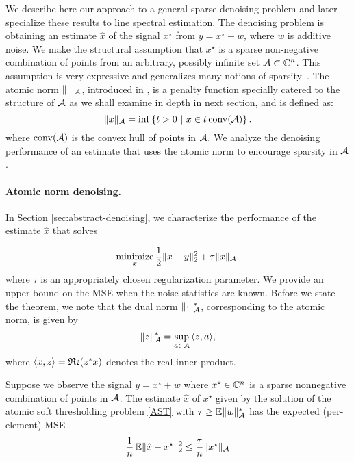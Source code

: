 We describe here our approach to a general sparse denoising problem and later
specialize these results to line spectral estimation. The denoising problem is
obtaining an estimate $\hat{x}$ of the signal $x^\star$ from $y = x^\star + w$,
where $w$ is additive noise. We make the structural assumption that $x^\star$ is
a sparse non-negative combination of points from an arbitrary, possibly infinite
set $\mathcal{A} \subset \mathbb{C}^n$. This assumption is very expressive and generalizes many
notions of sparsity~\cite{crpw}. The atomic norm $\lVert\cdot\rVert_{\mathcal{A}}$, introduced
in \cite{crpw}, is a penalty function specially catered to the structure of $\mathcal{A}$
as we shall examine in depth in next section, and is defined as:
\begin{equation*} \lVert x\rVert_{\mathcal{A}} = \inf\left\{t > 0 ~\middle|~ x \in t \operatorname{conv}(\mathcal{A})
\right\}. \end{equation*} where $\operatorname{conv}(\mathcal{A})$ is the convex hull of points in
$\mathcal{A}.$ We analyze the denoising performance of an estimate that uses the atomic
norm to encourage sparsity in $\mathcal{A}$.

\paragraph*{Atomic norm denoising.} In Section \ref{sec:abstract-denoising},
we characterize the performance of the estimate $\hat{x}$ that solves

\begin{equation}
\label{AST}\mathop{\textrm{minimize}}_x \frac{1}{2} \lVert x - y\rVert_2^2 + \tau \lVert x\rVert_{\mathcal{A}}.
\end{equation}
where $\tau$ is an appropriately chosen regularization parameter. We provide an
upper bound on the MSE when the noise statistics are known. Before we state the
theorem, we note that the dual norm $\lVert\cdot\rVert_{\mathcal{A}}^*$, corresponding to the
atomic norm, is given by
\[
 \lVert z\rVert_{\mathcal{A}}^* = \sup_{a \in \mathcal{A}}{\langle z, a\rangle},
\]
where $\langle x, z\rangle = \mathop{\mathfrak{Re}}(z^*x)$ denotes the real inner product.  

\begin{theorem}
 \label{cor:expected-mse}

Suppose we observe the signal $y = x^\star + w$ where $x^\star \in \mathbb{C}^n$ is a
sparse nonnegative combination of points in $\mathcal{A}$. The estimate $\hat{x}$ of
$x^\star$ given by the solution of the atomic soft thresholding problem
\eqref{AST} with $\tau \geq \operatorname{\mathbb{E}} \lVert w\rVert_{\mathcal{A}}^*$ has the expected (per-element)
MSE
\[ 
\frac{1}{n}\operatorname{\mathbb{E}} \lVert\hat{x} - x^\star\rVert_2^2 \leq \frac{\tau}{n}\lVert x^\star\rVert_{\mathcal{A}}
\]

\end{theorem}

